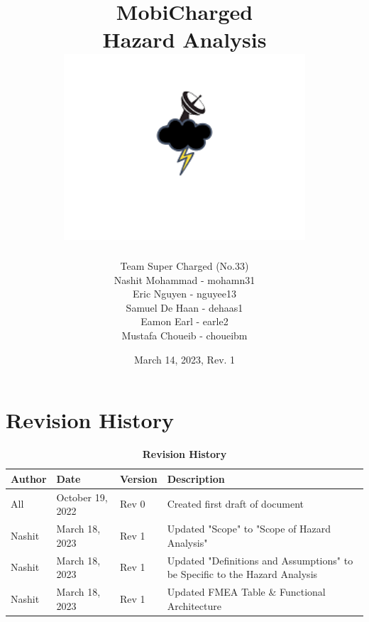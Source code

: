 \documentclass[12pt, titlepage]{article}
\begin{document}
\title{
    MobiCharged\\Hazard Analysis
    \includegraphics[width=9cm]{images/mobicharged.png} 
}
\author{Team Super Charged (No.33)
		\\ Nashit Mohammad - mohamn31
		\\ Eric Nguyen - nguyee13
		\\ Samuel De Haan - dehaas1
		\\ Eamon Earl - earle2
		\\ Mustafa Choueib - choueibm
}
    

\date{March 14, 2023, Rev. 1}


\maketitle

\tableofcontents
\listoffigures
\listoftables

\vspace{20pt}


\newpage


\section{Revision History}
\begin{center}
\begin{table}[H]
\caption{\bf Revision History}
    \begin{tabular}{p{2cm}p{3cm}p{2cm}p{6cm}}
    \hline
    \bf Author & \bf Date & \bf Version & \bf Description\\
    \hline
    All & October 19, 2022 & Rev 0 & Created first draft of document\\
    \hline
    Nashit & March 18, 2023 & Rev 1 & Updated "Scope" to "Scope of Hazard Analysis"\\
    \hline
    Nashit & March 18, 2023 & Rev 1 & Updated "Definitions and Assumptions" to be Specific to the Hazard Analysis\\
    \hline 
    Nashit & March 18, 2023 & Rev 1 & Updated FMEA Table \& Functional Architecture\\
    \hline 
    \end{tabular}
\end{table}
\end{center}
\end{document}

